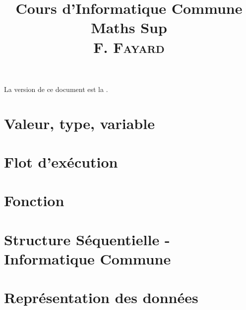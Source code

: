 \documentclass[book]{magnolia}
\title{{\Huge\bf Cours d'Informatique Commune}\\\vspace{1cm}
       \textbf{\Huge Maths Sup}\\\vspace{1cm}
       \textsc{F. Fayard}\\\vspace{1cm}
       }
\begin{document}
\maketitle

La version de ce document est la \textsc{\GITAbrHash}.

\tableofcontents


\chapter{Valeur, type, variable}
\setcounter{numeroexercicecours}{1}

% 

\chapter{Flot d'exécution}
\setcounter{numeroexercicecours}{1}

% 

\chapter{Fonction}
\setcounter{numeroexercicecours}{1}

% 

\chapter{Structure Séquentielle - Informatique Commune}
\setcounter{numeroexercicecours}{1}

% 

\chapter{Représentation des données}
\setcounter{numeroexercicecours}{1}

% 
\end{document}
